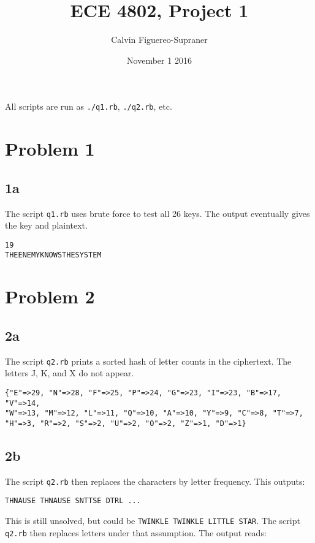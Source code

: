\documentclass[letterpaper, 12pt]{article}
\title{ECE 4802, Project 1}
\author{Calvin Figuereo-Supraner}
\date{November 1 2016}
\begin{document}
\maketitle
All scripts are run as \texttt{./q1.rb}, \texttt{./q2.rb}, etc.
\newpage

\section*{Problem 1}
\subsection*{1a}

The script \texttt{q1.rb}  uses brute force to test all 26 keys. The output eventually gives the key and plaintext.

\begin{Verbatim}[frame=single]
19
THEENEMYKNOWSTHESYSTEM
\end{Verbatim}

\section*{Problem 2}
\subsection*{2a}

The script \texttt{q2.rb} prints a sorted hash of letter counts in the ciphertext. The letters J, K, and X do not appear.

\begin{Verbatim}[frame=single]
{"E"=>29, "N"=>28, "F"=>25, "P"=>24, "G"=>23, "I"=>23, "B"=>17, "V"=>14,
"W"=>13, "M"=>12, "L"=>11, "Q"=>10, "A"=>10, "Y"=>9, "C"=>8, "T"=>7,
"H"=>3, "R"=>2, "S"=>2, "U"=>2, "O"=>2, "Z"=>1, "D"=>1}
\end{Verbatim}

\subsection*{2b}

The script \texttt{q2.rb} then replaces the characters by letter frequency. This outputs:

\begin{Verbatim}[frame=single]
THNAUSE THNAUSE SNTTSE DTRL ...
\end{Verbatim}


This is still unsolved, but could be \texttt{TWINKLE TWINKLE LITTLE STAR}. The script \texttt{q2.rb} then replaces letters under that assumption. The output reads:
\end{document}
